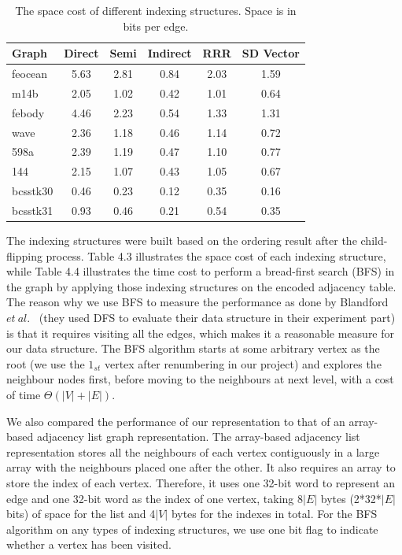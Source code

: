 \documentclass[12pt,glossary]{dalthesis}
\begin{document}
\begin{table}[ht]
\centering
\caption{The space cost of different indexing structures. Space is in bits per edge.}
\label{my-label}
\begin{tabular}{|l||c||c||c||c||c|}
\hline
Graph    & Direct & Semi & Indirect & RRR & SD Vector \\ \hline
feocean  &    5.63    &   2.81   &     0.84     &  2.03   &   1.59        \\
m14b     &    2.05    &   1.02   &    0.42      &  1.01   &   0.64        \\
febody   &    4.46   &   2.23   &     0.54     &  1.33   &    1.31        \\
wave     &   2.36    &   1.18   &    0.46      &   1.14   &   0.72         \\
598a     &    2.39    &   1.19   &   0.47       &  1.10   &    0.77       \\
144      &    2.15   &   1.07   &    0.43      &  1.05    &   0.67          \\
bcsstk30 &   0.46   &   0.23   &      0.12    &   0.35   &   0.16        \\
bcsstk31 &   0.93   &   0.46   &     0.21     &  0.54   &   0.35        \\ \hline
\end{tabular}
\end{table}
\bigskip

The indexing structures were built based on the ordering result after the child-flipping process. Table 4.3 illustrates the space cost of each indexing structure, while Table 4.4 illustrates the time cost to perform a bread-first search (BFS) in the graph by applying those indexing structures on the encoded adjacency table. The reason why we use BFS to measure the performance as done by Blandford $et \ al.$~\cite{compact-representation} (they used DFS to evaluate their data structure in their experiment part) is that it requires visiting all the edges, which makes it a reasonable measure for our data structure. The BFS algorithm starts at some arbitrary vertex as the root (we use the $1_{st}$ vertex after renumbering in our project) and explores the neighbour nodes first, before moving to the neighbours at next level, with a cost of time $\Theta(|V| + |E|)$. 

\bigskip

We also compared the performance of our representation to that of an array-based adjacency list graph representation. The array-based adjacency list representation stores all the neighbours of each vertex contiguously in a large array with the neighbours placed one after the other. It also requires an array to store the index of each vertex. Therefore, it uses one 32-bit word to represent an edge and one 32-bit word as the index of one vertex, taking 8$|E|$ bytes (2*32*$|E|$ bits) of space for the list and 4$|V|$ bytes for the indexes in total. For the BFS algorithm on any types of indexing structures, we use one bit flag to indicate whether a vertex has been visited.
\bigskip     
\end{document}
